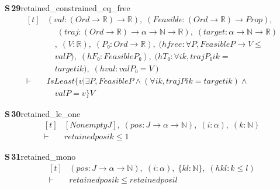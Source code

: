 \documentclass[conference]{IEEEtran}
\theoremstyle{definition}
\newcommand{\lean}[1]{\textsf{\footnotesize #1}}
\begin{document}
\noindent\textbf{S\,29}\quad\lean{retained\_constrained\_eq\_free}
{\footnotesize\[ \begin{aligned}[t]
&(\mathit{val} : (\mathit{Ord} \to \mathbb{R} ) \to \mathbb{R} ),\; (\mathit{Feasible} : (\mathit{Ord} \to \mathbb{R} ) \to \mathit{Prop}),\\
&\quad \; (\mathit{traj} : (\mathit{Ord} \to \mathbb{R} ) \to \alpha \to \mathbb{N} \to \mathbb{R} ),\; (\mathit{target} : \alpha \to \mathbb{N} \to \mathbb{R} )\\
&\quad ,\; (\mathit{V} : \mathbb{R} ),\; (\mathit{P₀} : \mathit{Ord} \to \mathbb{R} ),\; (\mathit{hfree} : \forall \mathit{P}, \mathit{Feasible} \mathit{P} \to \mathit{V} \leq\\
&\quad \mathit{val} \mathit{P}),\; (\mathit{hF₀} : \mathit{Feasible} \mathit{P₀}),\; (\mathit{hT₀} : \forall \mathit{i} \mathit{k}, \mathit{traj} \mathit{P₀} \mathit{i} \mathit{k} =\\
&\quad \mathit{target} \mathit{i} \mathit{k}),\; (\mathit{hval} : \mathit{val} \mathit{P₀} = \mathit{V})\\
\vdash\;&\mathit{IsLeast} \{ \mathit{v} | \exists \mathit{P}, \mathit{Feasible} \mathit{P} \wedge (\forall \mathit{i} \mathit{k}, \mathit{traj} \mathit{P} \mathit{i} \mathit{k} = \mathit{target} \mathit{i} \mathit{k}) \wedge\\
&\quad \mathit{val} \mathit{P} = \mathit{v}\} \mathit{V}
\end{aligned} \]}

\noindent\textbf{S\,30}\quad\lean{retained\_le\_one}
{\footnotesize\[ \begin{aligned}[t]
&[\mathit{Nonempty} \mathit{J}],\; (\mathit{pos} : \mathit{J} \to \alpha \to \mathbb{N} ),\; (\mathit{i} : \alpha ),\; (\mathit{k} : \mathbb{N} )\\
\vdash\;&\mathit{retained} \mathit{pos} \mathit{i} \mathit{k} \leq 1
\end{aligned} \]}

\noindent\textbf{S\,31}\quad\lean{retained\_mono}
{\footnotesize\[ \begin{aligned}[t]
&(\mathit{pos} : \mathit{J} \to \alpha \to \mathbb{N} ),\; (\mathit{i} : \alpha ),\; \{ \mathit{k} \mathit{l} : \mathbb{N} \},\; (\mathit{hkl} : \mathit{k} \leq \mathit{l})\\
\vdash\;&\mathit{retained} \mathit{pos} \mathit{i} \mathit{k} \leq \mathit{retained} \mathit{pos} \mathit{i} \mathit{l}
\end{aligned} \]}
\end{document}
